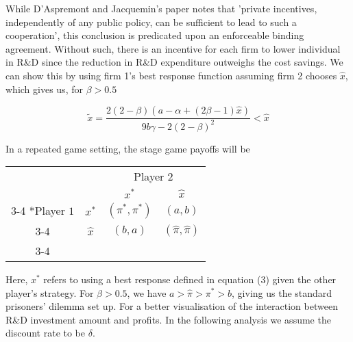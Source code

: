 \documentclass{article}
\begin{document}
While D'Aspremont and Jacquemin's paper notes that 'private incentives, independently of any public policy, can be sufficient to lead to such a cooperation', this conclusion is predicated upon an enforceable binding agreement. Without such, there is an incentive for each firm to lower individual in R\&D since the reduction in R\&D expenditure outweighs the cost savings. We can show this by using firm 1's best response function assuming firm 2 chooses $\hat{x}$, which gives us, for $\beta > 0.5$

\begin{equation*}
    \tilde{x} = \frac{2(2-\beta)(a-\alpha+(2\beta -1)\hat{x})}{9b\gamma-2(2-\beta)^2} < \hat{x}
\end{equation*}

In a repeated game setting, the stage game payoffs will be

\begin{table}[h]
    \centering
    \setlength{\extrarowheight}{2pt}
        \begin{tabular}{cc|c|c|}
          & \multicolumn{1}{c}{} & \multicolumn{2}{c}{Player $2$}\\
          & \multicolumn{1}{c}{} & \multicolumn{1}{c}{$x^*$}  & \multicolumn{1}{c}{$\hat{x}$} \\\cline{3-4}
          \multirow{2}*{Player $1$}  & $x^*$ & $(\pi^*,\pi^*)$ & $(a,b)$ \\\cline{3-4}
          & $\hat{x}$ & $(b,a)$ & $(\hat{\pi},\hat{\pi})$ \\\cline{3-4}
    \end{tabular}
\end{table}

Here, $x^*$ refers to using a best response defined in equation (3) given the other player's strategy. For $\beta > 0.5$, we have $a>\hat{\pi}>\pi^*>b$, giving us the standard prisoners' dilemma set up. For a better visualisation of the interaction between R\&D investment amount and profits. In the following analysis we assume the discount rate to be $\delta$.



\end{document}
